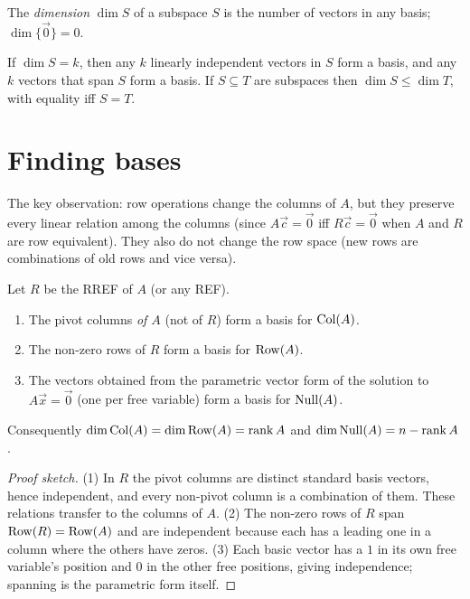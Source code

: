 \begin{definition}[Dimension]
The \emph{dimension} $\dim S$ of a subspace $S$ is the number of vectors in any basis; $\dim\{\vec0\}=0$.
\end{definition}

\begin{theorem}
If $\dim S=k$, then any $k$ linearly independent vectors in $S$ form a basis, and any $k$ vectors that
span $S$ form a basis. If $S\subseteq T$ are subspaces then $\dim S\le\dim T$, with equality iff $S=T$.
\end{theorem}

\section{Finding bases}

The key observation: row operations change the columns of $A$, but they preserve every linear
relation among the columns (since $A\vec c=\vec0$ iff $R\vec c=\vec0$ when $A$ and $R$ are row
equivalent). They also do not change the row space (new rows are combinations of old rows and vice
versa).

\begin{theorem}
Let $R$ be the RREF of $A$ (or any REF).
\begin{enumerate}
  \item The pivot columns \emph{of $A$} (not of $R$) form a basis for $\operatorname{Col}(A)$.
  \item The non-zero rows of $R$ form a basis for $\operatorname{Row}(A)$.
  \item The vectors obtained from the parametric vector form of the solution to $A\vec x=\vec0$
        (one per free variable) form a basis for $\operatorname{Null}(A)$.
\end{enumerate}
Consequently $\dim\operatorname{Col}(A)=\dim\operatorname{Row}(A)=\operatorname{rank} A$ and $\dim\operatorname{Null}(A)=n-\operatorname{rank} A$.
\end{theorem}
\begin{proof}[Proof sketch]
(1) In $R$ the pivot columns are distinct standard basis vectors, hence independent, and every
non-pivot column is a combination of them. These relations transfer to the columns of $A$.
(2) The non-zero rows of $R$ span $\operatorname{Row}(R)=\operatorname{Row}(A)$ and are independent because each has a leading one
in a column where the others have zeros. (3) Each basic vector has a $1$ in its own free variable's
position and $0$ in the other free positions, giving independence; spanning is the parametric
form itself.
\end{proof}

